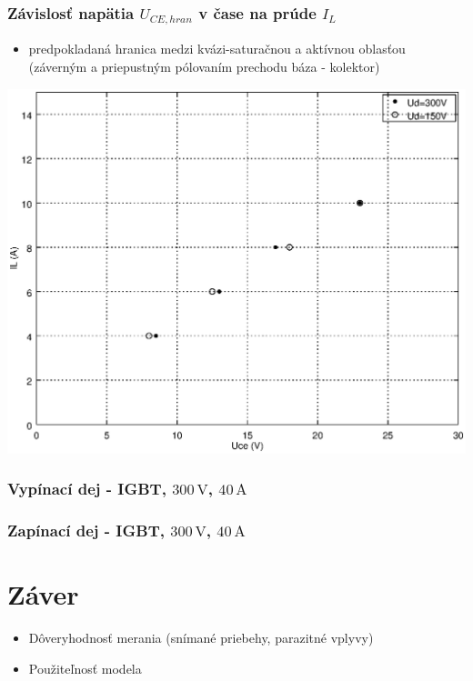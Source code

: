 \documentclass[oneside]{article}
\newcommand{\un}[1]{\, \mathrm{#1}}	%
\begin{document}
\newpage
\subsubsection*{Závislosť napätia $U_{CE,hran}$ v čase  na prúde $I_L$}
\begin{itemize}
    \item predpokladaná hranica medzi kvázi-saturačnou a aktívnou oblasťou (záverným a priepustným pólovaním prechodu báza - kolektor)
\end{itemize}
\includegraphics[height=.8\textheight]{obr/hranica_kvazisat_mozno}


\subsubsection*{Vypínací dej - IGBT, $300\un{V}$, $40\un{A}$}


\subsubsection*{Zapínací dej - IGBT, $300\un{V}$, $40\un{A}$}




\newpage
\section*{Záver} \label{sec:zaver} 
\begin{itemize}
    \item Dôveryhodnosť merania (snímané priebehy, parazitné vplyvy)
    \item Použiteľnosť modela
\end{itemize}
\end{document}
